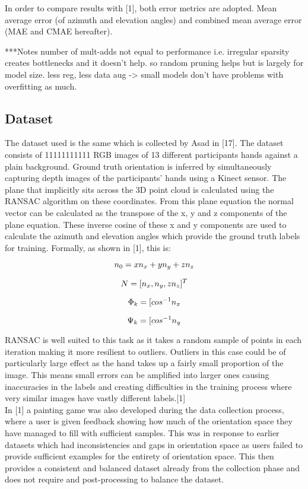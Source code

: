 \documentclass{article}
\begin{document}
In order to compare results with [1], both error metrics are adopted. Mean average error (of azimuth and elevation angles) and combined mean average error (MAE and CMAE hereafter).


***Notes
number of mult-adds not equal to performance i.e. irregular sparsity creates bottlenecks and it doesn't help. so random pruning helps but is largely for model size. less reg, less data aug -> small models don't have problems with overfitting as much.
\subsection*{Dataset}
The dataset used is the same which is collected by Asad in [17]. The dataset consists of 11111111111 RGB images of 13 different participants hands against a plain background. Ground truth orientation is inferred by simultaneously capturing depth images of the participants' hands using a Kinect sensor. The plane that implicitly sits across the 3D point cloud is calculated using the RANSAC algorithm on these coordinates. From this plane equation the normal vector can be calculated as the transpose of the x, y and z components of the plane equation. These inverse cosine of these x and y components are used to calculate the azimuth and elevation angles which provide the ground truth labels for training. Formally, as shown in [1], this is:

\[\emph{$n_{0}$} =  \emph{$xn_{x}$} + \emph{$yn_{y}$} + \emph{$zn_{z}$}\]

\[\emph{$N$} =  [\emph{$n_{x}$}, \emph{$n_{y}$}, \emph{$zn_{z}$}]^T\]

\[\emph{$\Phi_{k}$} =  [\emph{$cos^{-1}n_{x}$}\]

\[\emph{$\Psi_{k}$} =  [\emph{$cos^{-1}n_{y}$}\]

RANSAC is well suited to this task as it takes a random sample of points in each iteration making it more resilient to outliers. Outliers in this case could be of particularly large effect as the hand takes up a fairly small proportion of the image. This means small errors can be amplified into larger ones causing inaccuracies in the labels and creating difficulties in the training process where very similar images have vastly different labels.[1]\\

In [1] a painting game was also developed during the data collection process, where a user is given feedback showing how much of the orientation space they have managed to fill with sufficient samples. This was in response to earlier datasets which had inconsistencies and gaps in orientation space as users failed to provide sufficient examples for the entirety of orientation space. This then provides a consistent and balanced dataset already from the collection phase and does not require and post-processing to balance the dataset.
\end{document}
